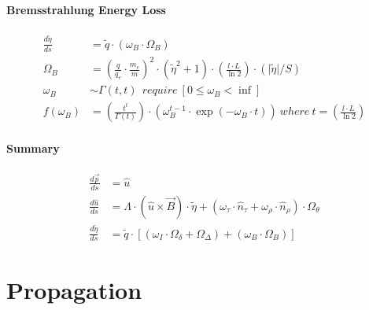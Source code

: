 \documentclass[review]{elsarticle}
\begin{document}
\paragraph{Bremsstrahlung Energy Loss}
\begin{equation} \begin{alignedat}{-1}
    \frac{d\tilde{\eta}}{ds}&=\tilde{q}\cdot\left(\omega_{B}\cdot\Omega_{B}\right) \\
    \Omega_{B}&={\left(\frac{q}{q_{e}}\cdot\frac{m_{e}}{m}\right)}^{2}\cdot(\tilde{\eta}^{2}+1)\cdot\left(\frac{l\cdot L}{\ln{2}}\right)\cdot(\bigl|\tilde{\eta}\bigr|/S) \\
    \omega_{B}&\sim\Gamma\left(t,t\right)\ \ require\ \left[0\leq\omega_{B}<\inf\right] \\ 
    f\left(\omega_{B}\right)&=\left(\frac{t^t}{\Gamma\left(t\right)}\right)\cdot\left(\omega_{B}^{t-1}\cdot\exp{\left(-\omega_{B}\cdot t\right)}\right)\ where\ t=\left(\frac{l\cdot L}{\ln{2}}\right)
\end{alignedat} \end{equation} 

\paragraph{Summary}
\begin{equation} \begin{alignedat}{-1}
    \frac{d\vec{p}}{ds}&=\hat{u} \\
    \frac{d\hat{u}}{ds}&=\Lambda\cdot(\hat{u}\times\vec{B})\cdot\tilde{\eta}+(\omega_{\tau}\cdot\hat{n}_{\tau}+\omega_{\rho}\cdot\hat{n}_{\rho})\cdot\Omega_{\theta} \\
    \frac{d\tilde{\eta}}{ds}&=\tilde{q}\cdot\left[\left(\omega_{I}\cdot\Omega_{\delta}+\Omega_{\Delta}\right)+\left(\omega_{B}\cdot\Omega_{B}\right)\right]
\end{alignedat} \end{equation} 

\section{Propagation}
\end{document}
